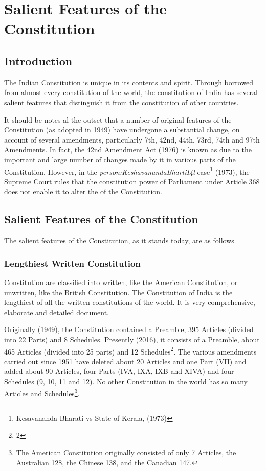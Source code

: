 \twocolumn
\cleardoublepage

\chapter{Salient Features of the Constitution}

\section{Introduction}

The Indian Constitution is unique in its contents and spirit. Through borrowed from almost every constitution of the world, the constitution of India has several salient features that distinguish it from the constitution of other countries.

It should be notes al the outset that a number of original features of the Constitution (as adopted in 1949) have undergone a substantial change, on account of several amendments, particularly 7th, 42nd, 44th, 73rd, 74th and 97th Amendments. In fact, the 42nd Amendment Act (1976) is known as  due to the important and large number of changes made by it in various parts of the Constitution. However, in the { \textit{\gls{person:KeshavanandaBhartiI4l}}} case\footnote{Kesavananda Bharati vs State of Kerala, (1973)} (1973), the Supreme Court rules that the constitution power of Parliament under Article 368 does not enable it to alter the  of the Constitution.

\section{Salient Features of the Constitution}

The salient features of the Constitution, as it stands today, are as follows

\subsection{Lengthiest Written Constitution}

Constitution are classified into written, like the American Constitution, or unwritten, like the British Constitution. The Constitution of India is the lengthiest of all the written constitutions of the world. It is very comprehensive, elaborate and detailed document.

Originally (1949), the Constitution contained a Preamble, 395 Articles (divided into 22 Parts) and 8 Schedules. Presently (2016), it consists of a Preamble, about 465 Articles (divided into 25 parts) and 12 Schedules\footnote{2}. The various amendments carried out since 1951 have deleted about 20 Articles and one Part (VII) and added about 90 Articles, four Parts (IVA, IXA, IXB and XIVA) and four Schedules (9, 10, 11 and 12). No other Constitution in the world has so many Articles and Schedules\footnote{The American Constitution originally consisted of only 7 Articles, the Australian 128, the Chinese 138, and the Canadian 147.}.

